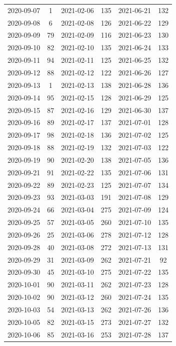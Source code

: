\begin{table}[ht]
\begin{tabular}{|cc|cc|cc}
  2020-09-07 & 1 & 2021-02-06 & 135 & 2021-06-21 & 132 \\ 
  2020-09-08 & 6 & 2021-02-08 & 126 & 2021-06-22 & 129 \\ 
  2020-09-09 & 79 & 2021-02-09 & 116 & 2021-06-23 & 130 \\ 
  2020-09-10 & 82 & 2021-02-10 & 135 & 2021-06-24 & 133 \\ 
  2020-09-11 & 94 & 2021-02-11 & 125 & 2021-06-25 & 132 \\ 
  2020-09-12 & 88 & 2021-02-12 & 122 & 2021-06-26 & 127 \\ 
  2020-09-13 & 1 & 2021-02-13 & 138 & 2021-06-28 & 136 \\ 
  2020-09-14 & 95 & 2021-02-15 & 128 & 2021-06-29 & 125 \\ 
  2020-09-15 & 87 & 2021-02-16 & 129 & 2021-06-30 & 137 \\ 
  2020-09-16 & 89 & 2021-02-17 & 137 & 2021-07-01 & 128 \\ 
  2020-09-17 & 98 & 2021-02-18 & 136 & 2021-07-02 & 125 \\ 
  2020-09-18 & 88 & 2021-02-19 & 132 & 2021-07-03 & 122 \\ 
  2020-09-19 & 90 & 2021-02-20 & 138 & 2021-07-05 & 136 \\ 
  2020-09-21 & 91 & 2021-02-22 & 135 & 2021-07-06 & 131 \\ 
  2020-09-22 & 89 & 2021-02-23 & 125 & 2021-07-07 & 134 \\ 
  2020-09-23 & 93 & 2021-03-03 & 191 & 2021-07-08 & 129 \\ 
  2020-09-24 & 66 & 2021-03-04 & 275 & 2021-07-09 & 124 \\ 
  2020-09-25 & 57 & 2021-03-05 & 260 & 2021-07-10 & 135 \\ 
  2020-09-26 & 25 & 2021-03-06 & 278 & 2021-07-12 & 128 \\ 
  2020-09-28 & 40 & 2021-03-08 & 272 & 2021-07-13 & 131 \\ 
  2020-09-29 & 31 & 2021-03-09 & 262 & 2021-07-21 & 92 \\ 
  2020-09-30 & 45 & 2021-03-10 & 275 & 2021-07-22 & 135 \\ 
  2020-10-01 & 90 & 2021-03-11 & 262 & 2021-07-23 & 128 \\ 
  2020-10-02 & 90 & 2021-03-12 & 260 & 2021-07-24 & 135 \\ 
  2020-10-03 & 54 & 2021-03-13 & 262 & 2021-07-26 & 136 \\ 
  2020-10-05 & 82 & 2021-03-15 & 273 & 2021-07-27 & 132 \\ 
  2020-10-06 & 85 & 2021-03-16 & 253 & 2021-07-28 & 137 \\ 

\end{tabular}
\end{table}
